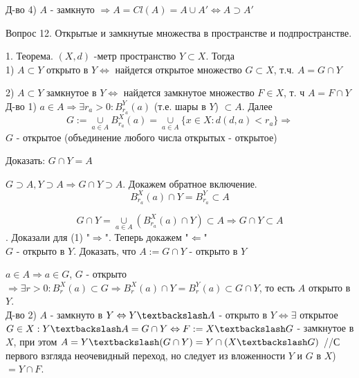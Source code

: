 \documentclass[12pt]{article}
\begin{document}
Д-во 4) $A$ - замкнуто $\Rightarrow A = Cl(A) = A \cup A' \Leftrightarrow A \supset A'$
\newpage

\begin{center}
Вопрос 12. Открытые и замкнутые множества в пространстве и подпространстве.
\end{center}

1. Теорема. $(X, d)$ -метр пространство $Y \subset X$. Тогда\\

1) $A \subset Y$ открыто в $Y \Leftrightarrow$ найдется открытое множество $G \subset X$, т.ч. $A=G\cap Y$

2) $A \subset Y$ замкнутое в $Y \Leftrightarrow$ найдется замкнутое множество $F \in X $, т. ч $A = F\cap Y$\\

Д-во 1) $a \in A \Rightarrow \exists r_a>0 : B_{r_a}^Y(a)$ (т.е. шары в $Y$) $\subset A$. Далее \\

\[G:= \underset{a\in A}{\cup} B_{r_a}^X(a) = \underset{a\in A}{\cup} \{x \in X: d(d, a)<r_a\} \Rightarrow\] $G$ - открытое (объединение любого числа открытых - открытое)

Доказать: $G\cap Y = A$

$G \supset A, Y \supset A \Rightarrow G\cap Y \supset A$. Докажем обратное включение.\\

\[B_{r_a}^X(a)\cap Y = B_{r_a}^Y \subset A\]

\[G\cap Y = \underset{a\in A}{\cup}(B_{r_a}^X(a) \cap Y) \subset A \Rightarrow G\cap Y \subset A \]. Доказали для (1) "$\Rightarrow$". Теперь докажем "$\Leftarrow$"\\

$G$ - открыто в $Y$. Доказать, что $A := G\cap Y$ - открыто в $Y$

$a \in A \Rightarrow a \in G$, $G$ - открыто$ \Rightarrow \exists r>0 : B_r^X(a) \subset G \Rightarrow B_r^X(a)\cap Y = B_r^Y(a) \subset G\cap Y$, то есть $A$ открыто в $Y$.\\

Д-во 2) $A$ - замкнуто в $Y \Leftrightarrow Y\textbackslash A$ - открыто в $Y \Leftrightarrow \exists$ открытое $G \in X : Y\textbackslash A = G\cap Y \Leftrightarrow F := X\textbackslash G$ - замкнутое в $X$, при этом $A = Y\textbackslash (G\cap Y) = Y\cap (X\textbackslash G)$ //С первого взгляда неочевидный переход, но следует из вложенности $Y$ и $G$ в $X$) $= Y\cap F$.
  
\newpage
\end{document}
